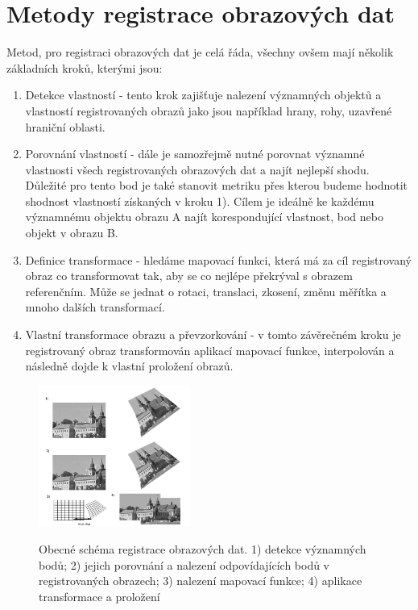 \documentclass{thesis}%
\begin{document}
\section{Metody registrace obrazových dat}
Metod, pro registraci obrazových dat je celá řáda, všechny ovšem mají několik základních kroků, kterými jsou:
\begin{enumerate}
\item Detekce vlastností - tento krok zajišťuje nalezení významných objektů a vlastností registrovaných obrazů jako jsou například hrany, rohy, uzavřené hraniční oblasti.
\item Porovnání vlastností - dále je samozřejmě nutné porovnat významné vlastnosti všech registrovaných obrazových dat a najít nejlepší shodu. Důležité pro tento bod je také stanovit  metriku přes kterou budeme hodnotit shodnost vlastností získaných v kroku 1). Cílem je ideálně ke každému významnému objektu obrazu A najít korespondující vlastnost, bod nebo objekt v obrazu B.
\item Definice transformace - hledáme mapovací funkci, která má za cíl registrovaný obraz co transformovat tak, aby se co nejlépe překrýval s obrazem referenčním. Může se jednat o rotaci, translaci, zkosení, změnu měřítka a mnoho dalších transformací.
\item Vlastní transformace obrazu a převzorkování - v tomto závěrečném kroku je registrovaný obraz transformován aplikací mapovací funkce, interpolován a následně dojde k vlastní proložení obrazů.
\end{enumerate}
 \begin{figure}[htp!]
  
	\centering\includegraphics[width=5cm]{reg_scheme.png}\\
	\caption[Obecné schéma registrace obrazových dat]{Obecné schéma registrace obrazových dat. 1) detekce významných bodů; 2) jejich porovnání a nalezení odpovídajících bodů v registrovaných obrazech; 3) nalezení mapovací funkce; 4) aplikace transformace a proložení}
\end{figure}
\end{document}
